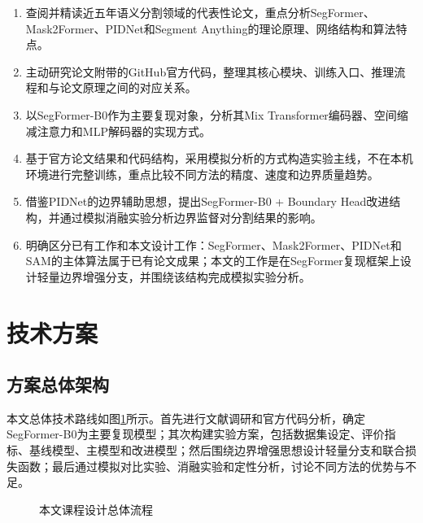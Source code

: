 \documentclass{report}
\begin{document}
\begin{enumerate}
    \item 查阅并精读近五年语义分割领域的代表性论文，重点分析SegFormer、Mask2Former、PIDNet和Segment Anything的理论原理、网络结构和算法特点。
    \item 主动研究论文附带的GitHub官方代码，整理其核心模块、训练入口、推理流程和与论文原理之间的对应关系。
    \item 以SegFormer-B0作为主要复现对象，分析其Mix Transformer编码器、空间缩减注意力和MLP解码器的实现方式。
    \item 基于官方论文结果和代码结构，采用模拟分析的方式构造实验主线，不在本机环境进行完整训练，重点比较不同方法的精度、速度和边界质量趋势。
    \item 借鉴PIDNet的边界辅助思想，提出SegFormer-B0 + Boundary Head改进结构，并通过模拟消融实验分析边界监督对分割结果的影响。
    \item 明确区分已有工作和本文设计工作：SegFormer、Mask2Former、PIDNet和SAM的主体算法属于已有论文成果；本文的工作是在SegFormer复现框架上设计轻量边界增强分支，并围绕该结构完成模拟实验分析。
\end{enumerate}

\section{技术方案}

\subsection{方案总体架构}

本文总体技术路线如图\ref{fig:pipeline}所示。首先进行文献调研和官方代码分析，确定SegFormer-B0为主要复现模型；其次构建实验方案，包括数据集设定、评价指标、基线模型、主模型和改进模型；然后围绕边界增强思想设计轻量分支和联合损失函数；最后通过模拟对比实验、消融实验和定性分析，讨论不同方法的优势与不足。

\begin{figure}[H]
\centering
{}
\caption{本文课程设计总体流程}
\label{fig:pipeline}
\end{figure}
\end{document}
